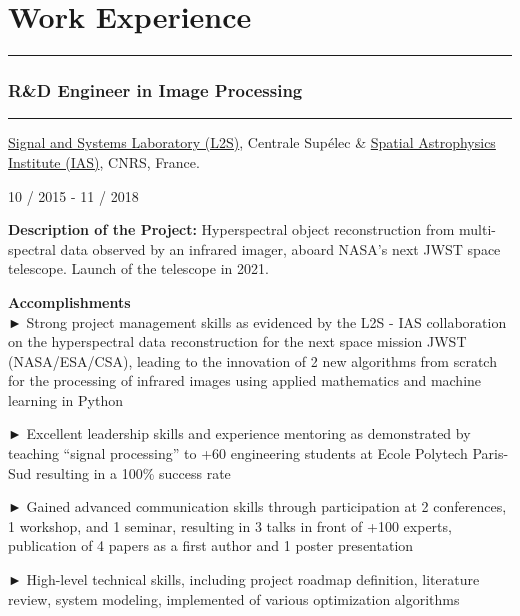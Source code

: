 \documentclass[
]{article}
\begin{document}
\hypertarget{work-experience}{%
\section{Work Experience}\label{work-experience}}

\begin{center}\rule{0.5\linewidth}{\linethickness}\end{center}

\hypertarget{rd-engineer-in-image-processing}{%
\subsubsection{R\&D Engineer in Image
Processing}\label{rd-engineer-in-image-processing}}

\begin{center}\rule{0.5\linewidth}{\linethickness}\end{center}

\href{http://www.l2s.centralesupelec.fr/}{Signal and Systems Laboratory
(L2S)}, Centrale Supélec \& \href{http://www.ias.u-psud.fr/}{Spatial
Astrophysics Institute (IAS)}, CNRS, France.

10 / 2015 - 11 / 2018

\textbf{Description of the Project:} Hyperspectral object reconstruction
from multi-spectral data observed by an infrared imager, aboard NASA's
next JWST space telescope. Launch of the telescope in 2021.

\textbf{Accomplishments}\\
► Strong project management skills as evidenced by the L2S - IAS
collaboration on the hyperspectral data reconstruction for the next
space mission JWST (NASA/ESA/CSA), leading to the innovation of 2 new
algorithms from scratch for the processing of infrared images using
applied mathematics and machine learning in Python

► Excellent leadership skills and experience mentoring as demonstrated
by teaching ``signal processing'' to +60 engineering students at Ecole
Polytech Paris-Sud resulting in a 100\% success rate

► Gained advanced communication skills through participation at 2
conferences, 1 workshop, and 1 seminar, resulting in 3 talks in front of
+100 experts, publication of 4 papers as a first author and 1 poster
presentation

► High-level technical skills, including project roadmap definition,
literature review, system modeling, implemented of various optimization
algorithms
\end{document}
